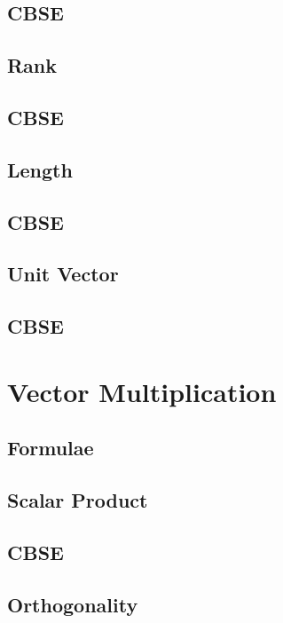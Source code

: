 \documentclass[journal]{IEEEtran}
\begin{document}
	\subsection{CBSE}
	
	\subsection{Rank}
	
	\subsection{CBSE}
	
	\subsection{Length}
	
	\subsection{CBSE}
	
	\subsection{Unit Vector}
	
	\subsection{CBSE}
	
	\newpage
	\section{Vector Multiplication}
	\subsection{Formulae}
	
	\subsection{Scalar Product}
	
	\subsection{CBSE}
	
	\subsection{Orthogonality}
	
\end{document}
